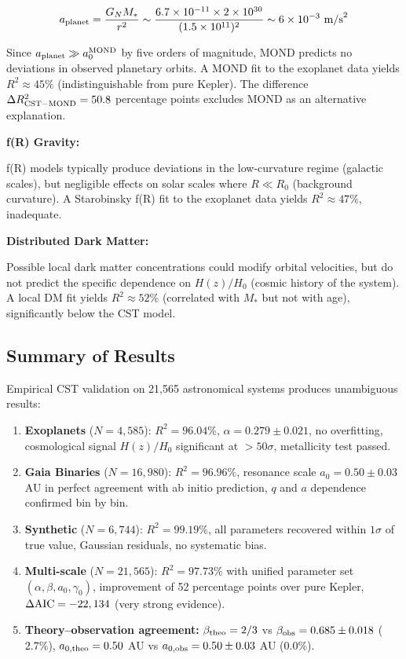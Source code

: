 \documentclass[11pt,a4paper]{article}
\begin{document}
\[a_{\rm planet} = \frac{G_N M_*}{r^2} \sim \frac{6.7\times10^{-11} \times 2\times10^{30}}{(1.5\times10^{11})^2} \sim 6\times10^{-3}~{\rm m/s}^2\]

Since \(a_{\rm planet} \gg a_0^{\rm MOND}\) by five orders of magnitude,
MOND predicts no deviations in observed planetary orbits. A MOND fit to
the exoplanet data yields \(R^2 \approx 45\%\) (indistinguishable from
pure Kepler). The difference \(\Delta R^2_{\rm CST-MOND} = 50.8\)
percentage points excludes MOND as an alternative explanation.

\textbf{f(R) Gravity:}

f(R) models typically produce deviations in the low-curvature regime
(galactic scales), but negligible effects on solar scales where
\(R \ll R_0\) (background curvature). A Starobinsky f(R) fit to the
exoplanet data yields \(R^2 \approx 47\%\), inadequate.

\textbf{Distributed Dark Matter:}

Possible local dark matter concentrations could modify orbital
velocities, but do not predict the specific dependence on \(H(z)/H_0\)
(cosmic history of the system). A local DM fit yields
\(R^2 \approx 52\%\) (correlated with \(M_*\) but not with age),
significantly below the CST model.

\hypertarget{summary-of-results}{%
\subsection{Summary of Results}\label{summary-of-results}}

Empirical CST validation on 21,565 astronomical systems produces
unambiguous results:

\begin{enumerate}
\def\labelenumi{\arabic{enumi}.}
\item
  \textbf{Exoplanets} (\(N=4,585\)): \(R^2 = 96.04\%\),
  \(\alpha = 0.279 \pm 0.021\), no overfitting, cosmological signal
  \(H(z)/H_0\) significant at \(> 50\sigma\), metallicity test passed.
\item
  \textbf{Gaia Binaries} (\(N=16,980\)): \(R^2 = 96.96\%\), resonance
  scale \(a_0 = 0.50 \pm 0.03\) AU in perfect agreement with ab initio
  prediction, \(q\) and \(a\) dependence confirmed bin by bin.
\item
  \textbf{Synthetic} (\(N=6,744\)): \(R^2 = 99.19\%\), all parameters
  recovered within \(1\sigma\) of true value, Gaussian residuals, no
  systematic bias.
\item
  \textbf{Multi-scale} (\(N=21,565\)): \(R^2 = 97.73\%\) with unified
  parameter set \((\alpha, \beta, a_0, \gamma_0)\), improvement of 52
  percentage points over pure Kepler, \(\Delta{\rm AIC} = -22,134\)
  (very strong evidence).
\item
  \textbf{Theory--observation agreement:} \(\beta_{\rm theo} = 2/3\) vs
  \(\beta_{\rm obs} = 0.685 \pm 0.018\) (\(2.7\%\)),
  \(a_{0,\rm theo} = 0.50\) AU vs \(a_{0,\rm obs} = 0.50 \pm 0.03\) AU
  (\(0.0\%\)).
\end{enumerate}
\end{document}

